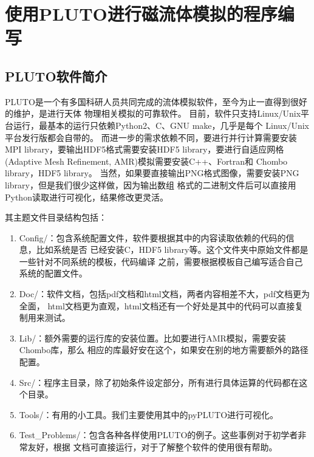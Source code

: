 \chapter{使用PLUTO进行磁流体模拟的程序编写}
\label{PLUTO}



\section{PLUTO软件简介}
\label{PLUTOintro}
PLUTO是一个有多国科研人员共同完成的流体模拟软件，至今为止一直得到很好的维护，是进行天体
物理相关模拟的可靠软件\citep{Mignone2007,Mignone2012}。
目前，软件只支持Linux/Unix平台运行，最基本的运行只依赖Python2、C、GNU make，几乎是每个
Linux/Unix平台发行版都会自带的。
而进一步的需求依赖不同，要进行并行计算需要安装MPI library，要输出HDF5格式需要安装HDF5
library，要进行自适应网格(Adaptive Mesh Refinement, AMR)模拟需要安装C++、Fortran和
Chombo library，HDF5 library。
当然，如果要直接输出PNG格式图像，需要安装PNG library，但是我们很少这样做，因为输出数组
格式的二进制文件后可以直接用Python读取进行可视化，结果修改更灵活。

其主题文件目录结构包括：

\begin{enumerate}

    \item Config/：包含系统配置文件，软件要根据其中的内容读取依赖的代码的信息，比如系统是否
    已经安装C，HDF5 library等。这个文件夹中原始文件都是一些针对不同系统的模板，代码编译
    之前，需要根据模板自己编写适合自己系统的配置文件。

    \item Doc/：软件文档，包括pdf文档和html文档，两者内容相差不大，pdf文档更为全面，
    html文档更为直观，html文档还有一个好处是其中的代码可以直接复制用来测试。

    \item Lib/：额外需要的运行库的安装位置。比如要进行AMR模拟，需要安装Chombo库，那么
    相应的库最好安在这个，如果安在别的地方需要额外的路径配置。

    \item Src/：程序主目录，除了初始条件设定部分，所有进行具体运算的代码都在这个目录。

    \item Tools/：有用的小工具。我们主要使用其中的pyPLUTO进行可视化。

    \item Test\_Problems/：包含各种各样使用PLUTO的例子。这些事例对于初学者非常友好，根据
    文档可直接运行，对于了解整个软件的使用很有帮助。

\end{enumerate}

